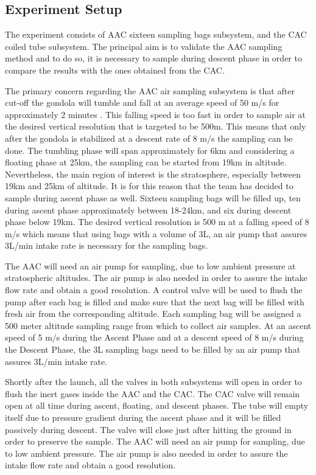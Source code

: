 \subsection{Experiment Setup} \label{Experiment_Setup}

The experiment consists of AAC sixteen sampling bags subsystem, and the CAC coiled tube subsystem. The principal aim is to validate the AAC sampling method and to do so, it is necessary to sample during descent phase in order to compare the results with the ones obtained from the CAC.

The primary concern regarding the AAC air sampling subsystem is that after cut-off the gondola will tumble and fall at an average speed of 50 m/s for approximately 2 minutes \cite{BexusManual}. This falling speed is too fast in order to sample air at the desired vertical resolution that is targeted to be 500m. This means that only after the gondola is stabilized at a descent rate of 8 m/s the sampling can be done. The tumbling phase will span approximately for 6km and considering a floating phase at 25km, the sampling can be started from 19km in altitude. Nevertheless, the main region of interest is the stratosphere, especially between 19km and 25km of altitude. It is for this reason that the team has decided to sample during ascent phase as well. Sixteen sampling bags will be filled up, ten during ascent phase approximately between 18-24km, and six during descent phase below 19km. The desired vertical resolution is 500 m at a falling speed of 8 m/s which means that using bags with a volume of 3L, an air pump that assures 3L/min intake rate is necessary for the sampling bags.

The AAC will need an air pump for sampling, due to low ambient pressure at stratospheric altitudes. The air pump is also needed in order to assure the intake flow rate and obtain a good resolution. A control valve will be used to flush the pump after each bag is filled and make sure that the next bag will be filled with fresh air from the corresponding altitude. Each sampling bag will be assigned a 500 meter altitude sampling range from which to collect air samples. At an ascent speed of 5 m/s during the Ascent Phase and at a descent speed of 8 m/s during the Descent Phase, the 3L sampling bags need to be filled by an air pump that assures 3L/min intake rate.

Shortly after the launch, all the valves in both subsystems will open in order to flush the inert gases inside the AAC and the CAC. The CAC valve will remain open at all time during ascent, floating, and descent phases. The tube will empty itself due to pressure gradient during the ascent phase and it will be filled passively during descent. The valve will close just after hitting the ground in order to preserve the sample. The AAC will need an air pump for sampling, due to low ambient pressure. The air pump is also needed in order to assure the intake flow rate and obtain a good resolution.

